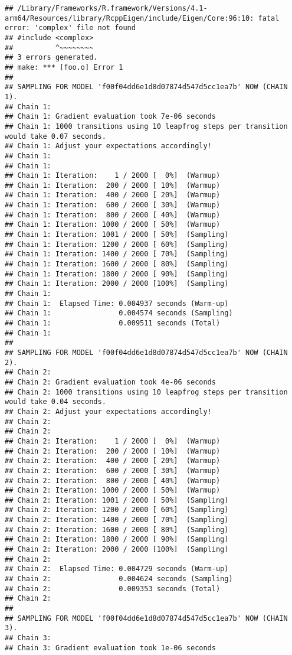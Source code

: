 \documentclass[
]{article}
\begin{document}
\begin{verbatim}
## /Library/Frameworks/R.framework/Versions/4.1-arm64/Resources/library/RcppEigen/include/Eigen/Core:96:10: fatal error: 'complex' file not found
## #include <complex>
##          ^~~~~~~~~
## 3 errors generated.
## make: *** [foo.o] Error 1
## 
## SAMPLING FOR MODEL 'f00f04dd6e1d8d07874d547d5cc1ea7b' NOW (CHAIN 1).
## Chain 1: 
## Chain 1: Gradient evaluation took 7e-06 seconds
## Chain 1: 1000 transitions using 10 leapfrog steps per transition would take 0.07 seconds.
## Chain 1: Adjust your expectations accordingly!
## Chain 1: 
## Chain 1: 
## Chain 1: Iteration:    1 / 2000 [  0%]  (Warmup)
## Chain 1: Iteration:  200 / 2000 [ 10%]  (Warmup)
## Chain 1: Iteration:  400 / 2000 [ 20%]  (Warmup)
## Chain 1: Iteration:  600 / 2000 [ 30%]  (Warmup)
## Chain 1: Iteration:  800 / 2000 [ 40%]  (Warmup)
## Chain 1: Iteration: 1000 / 2000 [ 50%]  (Warmup)
## Chain 1: Iteration: 1001 / 2000 [ 50%]  (Sampling)
## Chain 1: Iteration: 1200 / 2000 [ 60%]  (Sampling)
## Chain 1: Iteration: 1400 / 2000 [ 70%]  (Sampling)
## Chain 1: Iteration: 1600 / 2000 [ 80%]  (Sampling)
## Chain 1: Iteration: 1800 / 2000 [ 90%]  (Sampling)
## Chain 1: Iteration: 2000 / 2000 [100%]  (Sampling)
## Chain 1: 
## Chain 1:  Elapsed Time: 0.004937 seconds (Warm-up)
## Chain 1:                0.004574 seconds (Sampling)
## Chain 1:                0.009511 seconds (Total)
## Chain 1: 
## 
## SAMPLING FOR MODEL 'f00f04dd6e1d8d07874d547d5cc1ea7b' NOW (CHAIN 2).
## Chain 2: 
## Chain 2: Gradient evaluation took 4e-06 seconds
## Chain 2: 1000 transitions using 10 leapfrog steps per transition would take 0.04 seconds.
## Chain 2: Adjust your expectations accordingly!
## Chain 2: 
## Chain 2: 
## Chain 2: Iteration:    1 / 2000 [  0%]  (Warmup)
## Chain 2: Iteration:  200 / 2000 [ 10%]  (Warmup)
## Chain 2: Iteration:  400 / 2000 [ 20%]  (Warmup)
## Chain 2: Iteration:  600 / 2000 [ 30%]  (Warmup)
## Chain 2: Iteration:  800 / 2000 [ 40%]  (Warmup)
## Chain 2: Iteration: 1000 / 2000 [ 50%]  (Warmup)
## Chain 2: Iteration: 1001 / 2000 [ 50%]  (Sampling)
## Chain 2: Iteration: 1200 / 2000 [ 60%]  (Sampling)
## Chain 2: Iteration: 1400 / 2000 [ 70%]  (Sampling)
## Chain 2: Iteration: 1600 / 2000 [ 80%]  (Sampling)
## Chain 2: Iteration: 1800 / 2000 [ 90%]  (Sampling)
## Chain 2: Iteration: 2000 / 2000 [100%]  (Sampling)
## Chain 2: 
## Chain 2:  Elapsed Time: 0.004729 seconds (Warm-up)
## Chain 2:                0.004624 seconds (Sampling)
## Chain 2:                0.009353 seconds (Total)
## Chain 2: 
## 
## SAMPLING FOR MODEL 'f00f04dd6e1d8d07874d547d5cc1ea7b' NOW (CHAIN 3).
## Chain 3: 
## Chain 3: Gradient evaluation took 1e-06 seconds

\end{verbatim}
\end{document}
